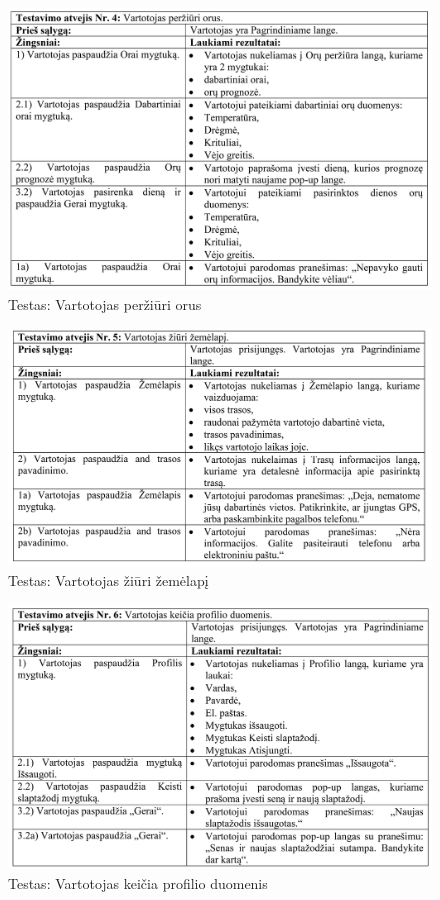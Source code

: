 \documentclass[oneside]{VUMIFPSkursinis}
\begin{document}
			\begin{figure}[h]
    				\centering
    				\includegraphics[width=1\textwidth]{test4.png}
    				\caption{Testas: Vartotojas peržiūri orus}
    				\label{fig:Testas: Vartotojas peržiūri orus}
			\end{figure}
			
			\begin{figure}[h]
    				\centering
    				\includegraphics[width=1\textwidth]{test5.png}
    				\caption{Testas: Vartotojas žiūri žemėlapį}
    				\label{fig:Testas: Vartotojas žiūri žemėlapį}
			\end{figure}
			
			\begin{figure}[h]
    				\centering
    				\includegraphics[width=1\textwidth]{test6.png}
    				\caption{Testas: Vartotojas keičia profilio duomenis}
    				\label{fig:Testas: Vartotojas keičia profilio duomenis}
			\end{figure}
\end{document}
